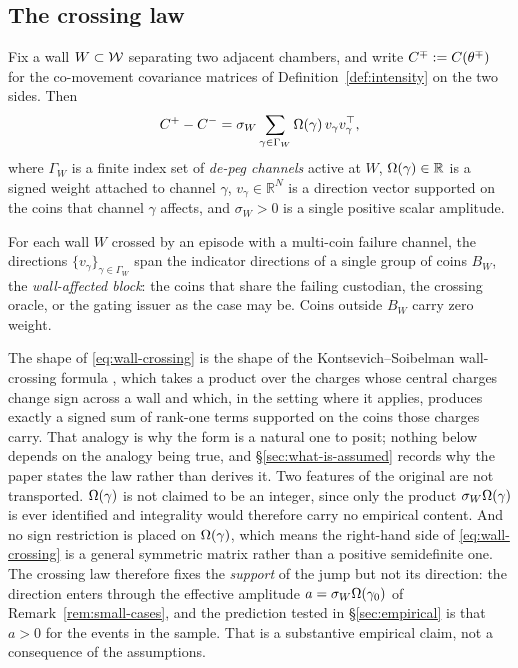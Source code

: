 \subsection{The crossing law}\label{sec:ks}
\begin{assumption}\label{ass:wallcrossing}
Fix a wall $W \subset \mathcal{W}$ separating two adjacent chambers, and write $C^\mp := C(\theta^\mp)$ for the co-movement covariance matrices of Definition~\ref{def:intensity} on the two sides. Then
\begin{equation}\label{eq:wall-crossing}
C^+ - C^- = \sigma_W \sum_{\gamma \in \Gamma_W} \Omega(\gamma) \, v_\gamma v_\gamma^\top ,
\end{equation}
where $\Gamma_W$ is a finite index set of \emph{de-peg channels} active at $W$, $\Omega(\gamma) \in \mathbb{R}$ is a signed weight attached to channel $\gamma$, $v_\gamma \in \mathbb{R}^N$ is a direction vector supported on the coins that channel $\gamma$ affects, and $\sigma_W > 0$ is a single positive scalar amplitude.
\end{assumption}

\begin{assumption}\label{ass:support}
For each wall $W$ crossed by an episode with a multi-coin failure channel, the directions $\{v_\gamma\}_{\gamma \in \Gamma_W}$ span the indicator directions of a single group of coins $B_W$, the \emph{wall-affected block}: the coins that share the failing custodian, the crossing oracle, or the gating issuer as the case may be. Coins outside $B_W$ carry zero weight.
\end{assumption}

The shape of \eqref{eq:wall-crossing} is the shape of the Kontsevich--Soibelman wall-crossing formula \citep{KontsevichSoibelman2008}, which takes a product over the charges whose central charges change sign across a wall and which, in the setting where it applies, produces exactly a signed sum of rank-one terms supported on the coins those charges carry. That analogy is why the form is a natural one to posit; nothing below depends on the analogy being true, and \S\ref{sec:what-is-assumed} records why the paper states the law rather than derives it. Two features of the original are not transported. $\Omega(\gamma)$ is not claimed to be an integer, since only the product $\sigma_W\Omega(\gamma)$ is ever identified and integrality would therefore carry no empirical content. And no sign restriction is placed on $\Omega(\gamma)$, which means the right-hand side of \eqref{eq:wall-crossing} is a general symmetric matrix rather than a positive semidefinite one. The crossing law therefore fixes the \emph{support} of the jump but not its direction: the direction enters through the effective amplitude $a=\sigma_W\Omega(\gamma_0)$ of Remark~\ref{rem:small-cases}, and the prediction tested in \S\ref{sec:empirical} is that $a>0$ for the events in the sample. That is a substantive empirical claim, not a consequence of the assumptions.

